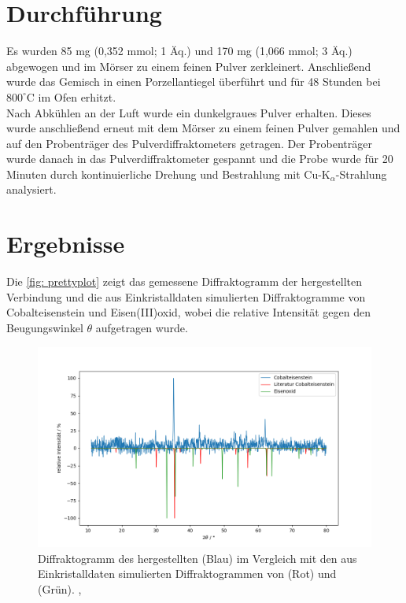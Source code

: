 \documentclass[a4paper,12pt,bibliography=totocnumbered]{scrartcl}
\begin{document}
\section{Durchführung}
Es wurden 85 mg  (0,352 mmol; 1 Äq.) und 170 mg  (1,066 mmol; 3 Äq.) abgewogen und im Mörser zu einem feinen Pulver zerkleinert. 
Anschließend wurde das Gemisch in einen Porzellantiegel überführt und für 48 Stunden bei $800 ^\circ$C im Ofen erhitzt.\\
Nach Abkühlen an der Luft wurde ein dunkelgraues Pulver erhalten. 
Dieses wurde anschließend erneut mit dem Mörser zu einem feinen Pulver gemahlen und auf den Probenträger des Pulverdiffraktometers getragen. 
Der Probenträger wurde danach in das Pulverdiffraktometer gespannt und die Probe wurde für 20 Minuten durch kontinuierliche Drehung und Bestrahlung mit Cu-K$_\alpha$-Strahlung analysiert.

\newpage

\section{Ergebnisse}
Die \autoref{fig: prettyplot} zeigt das gemessene Diffraktogramm der hergestellten Verbindung und 
die aus Einkristalldaten simulierten Diffraktogramme von Cobalteisenstein und Eisen(III)oxid, 
wobei die relative Intensität gegen den Beugungswinkel $\theta$ aufgetragen wurde. 
\begin{figure}[H]
    \centering
    \includegraphics[scale=0.65]{Bilder/messreihen.png}
    \caption{Diffraktogramm des hergestellten  (Blau) im Vergleich mit den aus Einkristalldaten simulierten Diffraktogrammen von  (Rot) und  (Grün). \cite{Rieck},\cite{FeDiff}}
    \label{fig: prettyplot}
\end{figure}
\end{document}
